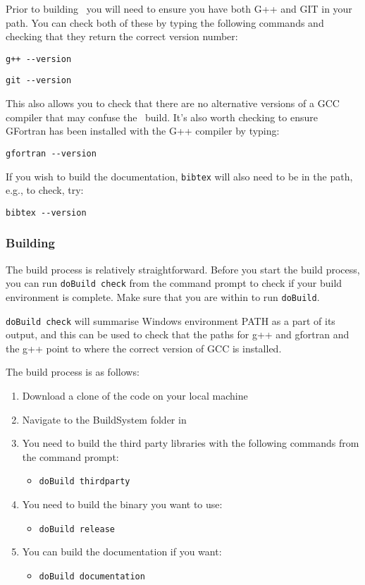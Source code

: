 Prior to building \CNAME\ you will need to ensure you have both G++ and GIT in your path. You can check both of these by typing the following commands and checking that they return the correct version number:

\texttt{g++ -{}-version}

\texttt{git -{}-version}

This also allows you to check that there are no alternative versions of a GCC compiler that may confuse the \CNAME\ build. It’s also worth checking to ensure GFortran has been installed with the G++ compiler by typing:

\texttt{gfortran -{}-version}

If you wish to build the documentation, \texttt{bibtex} will also need to be in the path, e.g., to check, try:

\texttt{bibtex -{}-version}

\subsubsection{Building \CNAME}

The build process is relatively straightforward. Before you start the build process, you can run \texttt{doBuild check} from the command prompt to check if your build environment is complete. Make sure that you are within  to run \texttt{doBuild}. 

\texttt{doBuild check} will summarise Windows environment PATH as a part of its output, and this can be used to check that the paths for g++ and gfortran and the g++ point to where the correct version of GCC is installed. 

The build process is as follows: 
\begin{enumerate}
  \item Download a clone of the code on your local machine
  \item Navigate to the BuildSystem folder in 
  \item You need to build the third party libraries with the following commands from the command prompt:
  \begin{itemize}
    \item \texttt{doBuild thirdparty}
  \end{itemize}
  \item You need to build the binary you want to use:
  \begin{itemize}
    \item \texttt{doBuild release}
  \end{itemize}
  \item You can build the documentation if you want:
  \begin{itemize}
    \item \texttt{doBuild documentation}
  \end{itemize}
\end{enumerate}

